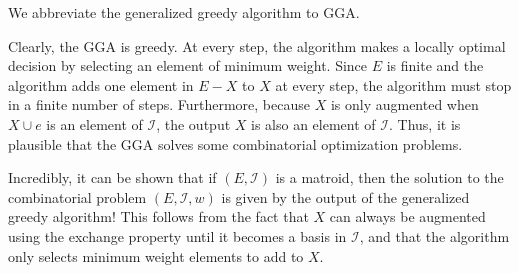 \documentclass[a4paper,11pt]{report}
\theoremstyle{plain}
\theoremstyle{definition}
\newcommand{\I}{\mathcal{I}}
\begin{document}
We abbreviate the generalized greedy algorithm to GGA.

Clearly, the GGA is greedy. At every step, the algorithm makes a locally
optimal decision by selecting an element of minimum weight. Since $E$ is
finite and the algorithm adds one element in $E - X$ to $X$ at every step,
the algorithm must stop in a finite number of steps. Furthermore, because
$X$ is only augmented when $X \cup e$ is an element of $\I$, the output $X$
is also an element of $\I$. Thus, it is plausible that the GGA solves some
combinatorial optimization problems.

Incredibly, it can be shown that if $(E,\I)$ is a matroid, then the solution to
the combinatorial problem $(E,\I,w)$ is given by the output of the generalized
greedy algorithm! This follows from the fact that $X$ can always be augmented
using the exchange property until it becomes a basis in $\I$, and that the
algorithm only selects minimum weight elements to add to $X$.
\end{document}
